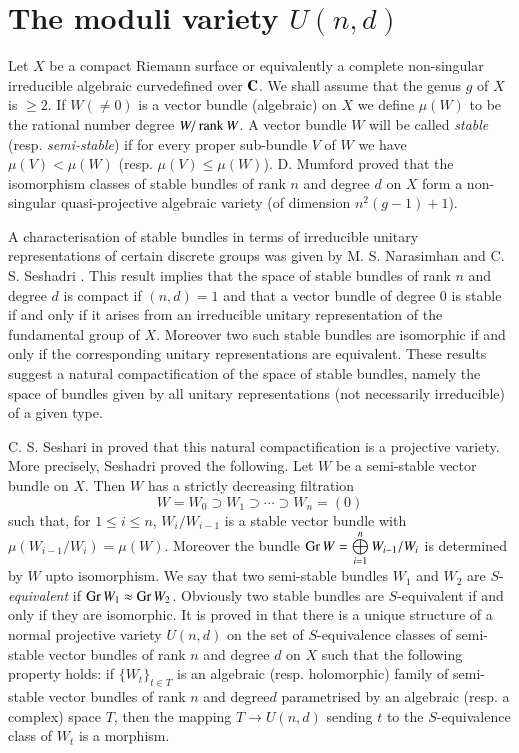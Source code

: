 \section{The moduli variety \texorpdfstring{$U(n,d)$}{Und}}\label{art17-sec2}

Let $X$ be a compact Riemann surface or equivalently a complete non-singular irreducible algebraic curve\pageoriginale defined over $\mathbf{C}$. We shall assume that the genus $g$ of $X$ is $\geq 2$. If $W(\neq 0)$ is a vector bundle (algebraic) on $X$ we define $\mu(W)$ to be the rational number degree $W/\operatorname{\mathrm{rank}} W$. A vector bundle $W$ will be called {\em stable} (resp. {\em semi-stable}) if for every proper sub-bundle $V$ of $W$ we have $\mu(V)<\mu(W)$ (resp. $\mu(V)\leq \mu(W)$). D. Mumford proved that the isomorphism classes of stable bundles of rank $n$ and degree $d$ on $X$ form a non-singular quasi-projective algebraic variety (of dimension $n^{2}(g-1)+1$).

A characterisation of stable bundles in terms of irreducible unitary representations of certain discrete groups was given by M. S. Narasimhan and C. S. Seshadri \cite{art17-key4}. This result implies that the space of stable bundles of rank $n$ and degree $d$ is compact if $(n,d)=1$ and that a vector bundle of degree 0 is stable if and only if it arises from an irreducible unitary representation of the fundamental group of $X$. Moreover two such stable bundles are isomorphic if and only if the corresponding unitary representations are equivalent. These results suggest a natural compactification of the space of stable bundles, namely the space of bundles given by all unitary representations (not necessarily irreducible) of a given type.

C. S. Seshari in \cite{art17-key7} proved that this natural compactification is a projective variety. More precisely, Seshadri proved the following. Let $W$ be a semi-stable vector bundle on $X$. Then $W$ has a strictly decreasing filtration
$$
W=W_{0}\supset W_{1}\supset \cdots \supset W_{n}=(0)
$$
such that, for $1\leq i\leq n$, $W_{i}/W_{i-1}$ is a stable vector bundle with $\mu(W_{i-1}/W_{i})=\mu(W)$. Moreover the bundle $\operatorname{\mathrm{Gr}} W=\bigoplus\limits^{n}_{i=1}W_{i-1}/W_{i}$ is determined by $W$ upto isomorphism. We say that two semi-stable bundles $W_{1}$ and $W_{2}$ are $S$-{\em equivalent} if $\operatorname{\mathrm{Gr}} W_{1}\approx \operatorname{\mathrm{Gr}} W_{2}$. Obviously two stable bundles are $S$-equivalent if and only if they are isomorphic. It is proved in \cite{art17-key7} that there is a unique structure of a normal projective variety $U(n,d)$ on the set of $S$-equivalence classes of semi-stable vector bundles of rank $n$ and degree $d$ on $X$ such that the following property holds: if $\{W_{t}\}_{t\in T}$ is an algebraic (resp. holomorphic) family of semi-stable vector bundles of rank $n$ and degree\pageoriginale $d$ parametrised by an algebraic (resp. a complex) space $T$, then the mapping $T\to U(n,d)$ sending $t$ to the $S$-equivalence class of $W_{t}$ is a morphism.

